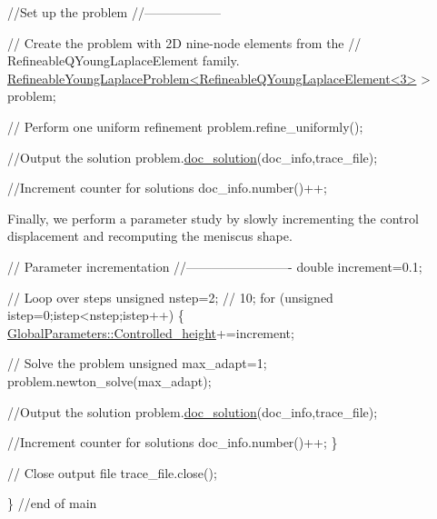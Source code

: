 \begin{DoxyCodeInclude}


 \textcolor{comment}{//Set up the problem}
 \textcolor{comment}{//------------------}

 \textcolor{comment}{// Create the problem with 2D nine-node elements from the}
 \textcolor{comment}{// RefineableQYoungLaplaceElement family. }
 \hyperlink{classRefineableYoungLaplaceProblem}{RefineableYoungLaplaceProblem<RefineableQYoungLaplaceElement<3>}
       > problem;

 \textcolor{comment}{// Perform one uniform refinement}
 problem.refine\_uniformly();

 \textcolor{comment}{//Output the solution}
 problem.\hyperlink{classRefineableYoungLaplaceProblem_a4ec7313c8e4015b0c2af0bbef789e70f}{doc\_solution}(doc\_info,trace\_file);

 \textcolor{comment}{//Increment counter for solutions }
 doc\_info.number()++;

\end{DoxyCodeInclude}


Finally, we perform a parameter study by slowly incrementing the control displacement and recomputing the meniscus shape.


\begin{DoxyCodeInclude}

 \textcolor{comment}{// Parameter incrementation}
 \textcolor{comment}{//------------------------- }
 \textcolor{keywordtype}{double} increment=0.1;

 \textcolor{comment}{// Loop over steps}
 \textcolor{keywordtype}{unsigned} nstep=2; \textcolor{comment}{// 10;}
 \textcolor{keywordflow}{for} (\textcolor{keywordtype}{unsigned} istep=0;istep<nstep;istep++)
  \{
   \hyperlink{namespaceGlobalParameters_a3731f24a02ce4f306d65a9a488f85c96}{GlobalParameters::Controlled\_height}+=increment;

   \textcolor{comment}{// Solve the problem  }
   \textcolor{keywordtype}{unsigned} max\_adapt=1;
   problem.newton\_solve(max\_adapt);
 
   \textcolor{comment}{//Output the solution}
   problem.\hyperlink{classRefineableYoungLaplaceProblem_a4ec7313c8e4015b0c2af0bbef789e70f}{doc\_solution}(doc\_info,trace\_file);
   
   \textcolor{comment}{//Increment counter for solutions }
   doc\_info.number()++;
  \}
 
 \textcolor{comment}{// Close output file}
 trace\_file.close();
 
\} \textcolor{comment}{//end of main}

\end{DoxyCodeInclude}




